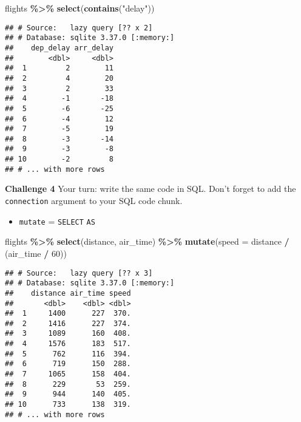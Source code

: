 \documentclass[
]{book}
\newenvironment{Shaded}{\begin{snugshade}}{\end{snugshade}}
\newcommand{\DataTypeTok}[1]{\textcolor[rgb]{0.13,0.29,0.53}{#1}}
\newcommand{\DecValTok}[1]{\textcolor[rgb]{0.00,0.00,0.81}{#1}}
\newcommand{\KeywordTok}[1]{\textcolor[rgb]{0.13,0.29,0.53}{\textbf{#1}}}
\newcommand{\NormalTok}[1]{#1}
\newcommand{\OperatorTok}[1]{\textcolor[rgb]{0.81,0.36,0.00}{\textbf{#1}}}
\newcommand{\StringTok}[1]{\textcolor[rgb]{0.31,0.60,0.02}{#1}}
\providecommand{\tightlist}{%
  \setlength{\itemsep}{0pt}\setlength{\parskip}{0pt}}
\begin{document}
\begin{Shaded}
\begin{Highlighting}[]
\NormalTok{flights }\OperatorTok{\%\textgreater{}\%}\StringTok{ }
\StringTok{  }\KeywordTok{select}\NormalTok{(}\KeywordTok{contains}\NormalTok{(}\StringTok{"delay"}\NormalTok{))}
\end{Highlighting}
\end{Shaded}

\begin{verbatim}
## # Source:   lazy query [?? x 2]
## # Database: sqlite 3.37.0 [:memory:]
##    dep_delay arr_delay
##        <dbl>     <dbl>
##  1         2        11
##  2         4        20
##  3         2        33
##  4        -1       -18
##  5        -6       -25
##  6        -4        12
##  7        -5        19
##  8        -3       -14
##  9        -3        -8
## 10        -2         8
## # ... with more rows
\end{verbatim}

\textbf{Challenge 4}
Your turn: write the same code in SQL. Don't forget to add the \texttt{connection} argument to your SQL code chunk.

\begin{itemize}
\tightlist
\item
  \texttt{mutate} = \texttt{SELECT} \texttt{AS}
\end{itemize}

\begin{Shaded}
\begin{Highlighting}[]
\NormalTok{flights }\OperatorTok{\%\textgreater{}\%}
\StringTok{  }\KeywordTok{select}\NormalTok{(distance, air\_time) }\OperatorTok{\%\textgreater{}\%}\StringTok{  }
\StringTok{  }\KeywordTok{mutate}\NormalTok{(}\DataTypeTok{speed =}\NormalTok{ distance }\OperatorTok{/}\StringTok{ }\NormalTok{(air\_time }\OperatorTok{/}\StringTok{ }\DecValTok{60}\NormalTok{)) }
\end{Highlighting}
\end{Shaded}

\begin{verbatim}
## # Source:   lazy query [?? x 3]
## # Database: sqlite 3.37.0 [:memory:]
##    distance air_time speed
##       <dbl>    <dbl> <dbl>
##  1     1400      227  370.
##  2     1416      227  374.
##  3     1089      160  408.
##  4     1576      183  517.
##  5      762      116  394.
##  6      719      150  288.
##  7     1065      158  404.
##  8      229       53  259.
##  9      944      140  405.
## 10      733      138  319.
## # ... with more rows
\end{verbatim}
\end{document}
